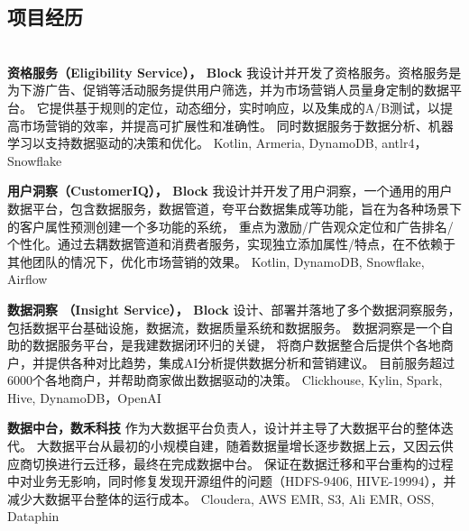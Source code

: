 \documentclass{res}[8.5pt]
\begin{document}
\begin{resume}
                \vspace{-10pt}
                \section{{项目经历}}
                \vspace{-12pt}
                \hrulefill\\

                \vspace{-35pt}
                {\bf 资格服务（Eligibility Service）， Block}
                我设计并开发了资格服务。资格服务是为下游广告、促销等活动服务提供用户筛选，并为市场营销人员量身定制的数据平台。
                它提供基于规则的定位，动态细分，实时响应，以及集成的A/B测试，以提高市场营销的效率，并提高可扩展性和准确性。
                同时数据服务于数据分析、机器学习以支持数据驱动的决策和优化。
                Kotlin, Armeria, DynamoDB, antlr4，Snowflake

                \vspace{-10pt}
                {\bf 用户洞察（CustomerIQ）， Block}
                我设计并开发了用户洞察，一个通用的用户数据平台，包含数据服务，数据管道，夸平台数据集成等功能，旨在为各种场景下的客户属性预测创建一个多功能的系统，
                重点为激励/广告观众定位和广告排名/个性化。通过去耦数据管道和消费者服务，实现独立添加属性/特点，在不依赖于其他团队的情况下，优化市场营销的效果。
                Kotlin, DynamoDB, Snowflake, Airflow

                \vspace{-10pt}
                {\bf 数据洞察 （Insight Service）， Block}
                设计、部署并落地了多个数据洞察服务，包括数据平台基础设施，数据流，数据质量系统和数据服务。
                数据洞察是一个自助的数据服务平台，是我建数据闭环归的关键，
                将商户数据整合后提供个各地商户，并提供各种对比趋势，集成AI分析提供数据分析和营销建议。
                目前服务超过6000个各地商户，并帮助商家做出数据驱动的决策。
                Clickhouse, Kylin, Spark, Hive, DynamoDB，OpenAI

                \vspace{-10pt}
                {\bf 数据中台，数禾科技}
                作为大数据平台负责人，设计并主导了大数据平台的整体迭代。
                大数据平台从最初的小规模自建，随着数据量增长逐步数据上云，又因云供应商切换进行云迁移，最终在完成数据中台。
                保证在数据迁移和平台重构的过程中对业务无影响，同时修复发现开源组件的问题（HDFS-9406, HIVE-19994），并减少大数据平台整体的运行成本。
                Cloudera, AWS EMR, S3, Ali EMR, OSS, Dataphin


\end{resume}
\end{document}
